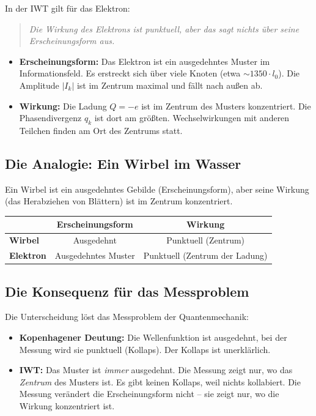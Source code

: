 In der IWT gilt für das Elektron:

\begin{quote}
    \emph{Die Wirkung des Elektrons ist punktuell, aber das sagt nichts über seine Erscheinungsform aus.}
\end{quote}

\begin{itemize}
    \item \textbf{Erscheinungsform:} Das Elektron ist ein ausgedehntes Muster im Informationsfeld. Es erstreckt sich über viele Knoten (etwa \( \sim 1350 \cdot l_0 \)). Die Amplitude \( |I_k| \) ist im Zentrum maximal und fällt nach außen ab.
    \item \textbf{Wirkung:} Die Ladung \( Q = -e \) ist im Zentrum des Musters konzentriert. Die Phasendivergenz \( q_k \) ist dort am größten. Wechselwirkungen mit anderen Teilchen finden am Ort des Zentrums statt.
\end{itemize}

\subsection{Die Analogie: Ein Wirbel im Wasser}

Ein Wirbel ist ein ausgedehntes Gebilde (Erscheinungsform), aber seine Wirkung (das Herabziehen von Blättern) ist im Zentrum konzentriert.

\begin{tabular}{l|c|c}
 & \textbf{Erscheinungsform} & \textbf{Wirkung} \\
\hline
\textbf{Wirbel} & Ausgedehnt & Punktuell (Zentrum) \\
\textbf{Elektron} & Ausgedehntes Muster & Punktuell (Zentrum der Ladung) \\
\end{tabular}

\subsection{Die Konsequenz für das Messproblem}

Die Unterscheidung löst das Messproblem der Quantenmechanik:

\begin{itemize}
    \item \textbf{Kopenhagener Deutung:} Die Wellenfunktion ist ausgedehnt, bei der Messung wird sie punktuell (Kollaps). Der Kollaps ist unerklärlich.
    \item \textbf{IWT:} Das Muster ist \emph{immer} ausgedehnt. Die Messung zeigt nur, wo das \emph{Zentrum} des Musters ist. Es gibt keinen Kollaps, weil nichts kollabiert. Die Messung verändert die Erscheinungsform nicht – sie zeigt nur, wo die Wirkung konzentriert ist.
\end{itemize}

